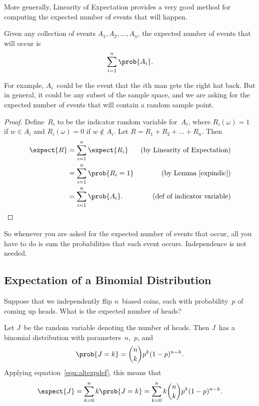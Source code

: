 More generally, Linearity of Expectation provides a very good method
for computing the expected number of events that will happen.

\begin{theorem}\label{thm:17T3}
Given any collection of events $A_1, A_2, \dots, A_n$, the expected
number of events that will occur is
\begin{equation*}
    \sum_{i = 1}^n \prob{A_i}.
\end{equation*}
\end{theorem}

For example, $A_i$~could be the event that the $i$th man gets the
right hat back.  But in general, it could be any subset of the sample
space, and we are asking for the expected number of events that will
contain a random sample point.

\begin{proof}

Define~$R_i$ to be the indicator random variable for~$A_i$, where
$R_i(\omega) = 1$ if $w \in A_i$ and $R_i(\omega) = 0$ if $w \notin A_i$.  Let
$R = R_1 + R_2 + \dots + R_n$.  Then
\begin{align*}
\expect{R}
    &= \sum_{i = 1}^n \expect{R_i}
    & \text{(by Linearity of Expectation)}\\
%
    &= \sum_{i = 1}^n \prob{R_i = 1}
    & \text{(by Lemma~\ref{expindic})}\\
%
%
    &= \sum_{i = 1}^n \prob{A_i}. \qedhere  
        & \text{(def of indicator variable)}\\
\end{align*}
\end{proof}

So whenever you are asked for the expected number of events that occur,
all you have to do is sum the probabilities that each event occurs.
Independence is not needed.

\subsection{Expectation of a Binomial Distribution}

Suppose that we independently flip $n$~biased coins, each with
probability~$p$ of coming up heads.  What is the expected number of
heads?

Let $J$~be the random variable denoting the number of heads.  Then
$J$~has a binomial distribution with parameters~$n$,~$p$, and
\begin{equation*}
    \prob{J = k} = \binom{n}{k} p^k (1 - p)^{n - k}.
\end{equation*}
Applying equation~\eqref{eqn:altexpdef}, this means that
\begin{equation} \label{eqn:17T7}
\expect{J}
    = \sum_{k = 0}^n k \prob{J = k}
    = \sum_{k = 0}^n k \binom{n}{k} p^k (1 - p)^{n - k}.
\end{equation}

